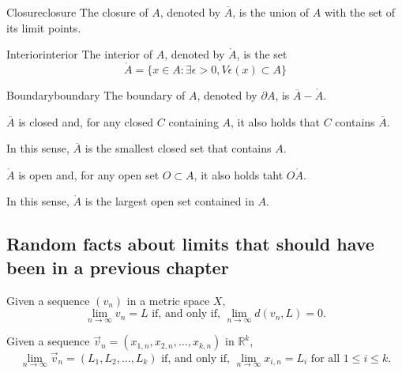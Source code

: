 
\begin{defn}{Closure}{closure}
	The closure of \(A\), denoted by \(\overline A\), is the union of \(A\) with the set of its limit points.
\end{defn}

\begin{defn}{Interior}{interior}
	The interior of \(A\), denoted by \(\mathring A\), is the set  \[
		\mathring A = \{x \in A : \exists \epsilon>0,  V\epsilon(x) \subset A \}
	\]
\end{defn}

\begin{defn}{Boundary}{boundary}
	The boundary of \(A\), denoted by \(\partial A\), is \(\overline A - \mathring A\).
\end{defn}

\begin{prop}{}{}
	\(\overline A\) is closed and, for any closed \(C\) containing \(A\), it also holds that \(C\) contains \(\overline A\).

	In this sense, \(\overline A\) is the smallest closed set that contains \(A\).
\end{prop}

\begin{prop}{}{}
	\(\mathring A\) is open and, for any open set \(O \subset A\), it also holds taht \(O \mathring A\).

	In this sense, \(\mathring A\) is the largest open set contained in \(A\).
\end{prop}

\subsection{Random facts about limits that should have been in a previous chapter}

\begin{thm}{}{}
	Given a sequence \((v_n)\) in a metric space \(X\), \[
		\lim_{n\to\infty} v_n = L \text{ if, and only if, } \lim_{n\to\infty} d(v_n, L) = 0.
	\]
\end{thm}

\begin{prop}{}{}
	Given a sequence \(\vec v_n = (x_{1, n}, x_{2, n}, \dots, x_{k, n})\) in  \(\mathbb{R}^k\), \[
		\lim_{n\to\infty} \vec v_n = (L_1, L_2, \dots, L_k) \text{ if, and only if, } \lim_{n\to\infty} x_{i, n} = L_i \text{ for all \(1 \leq i \leq k\)}.
	\]
\end{prop}

